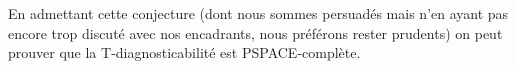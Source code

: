 \documentclass[conference]{IEEEtran}
\begin{document}
En admettant cette conjecture (dont nous sommes persuadés mais n'en ayant pas encore trop discuté avec nos encadrants, nous préférons rester prudents) on peut prouver que la T-diagnosticabilité est PSPACE-complète.



%
%



%
%
\end{document}

